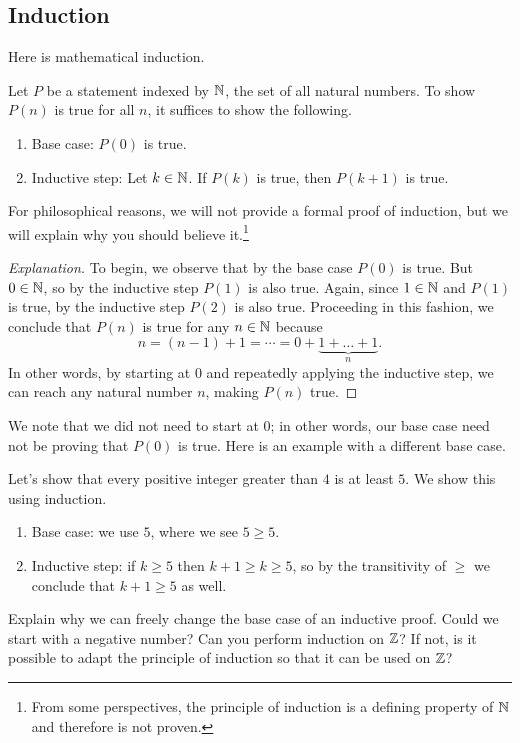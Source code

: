 \documentclass[../main.tex]{subfiles}
\begin{document}
\subsection{Induction}
Here is mathematical induction.
\begin{theorem}  \label{thm:induction}
    Let $P$ be a statement indexed by $\mathbb N$, the set of all natural numbers. To show $P(n)$ is true for all $n$, it suffices to show the following.
    \begin{enumerate}
        \item Base case: $P(0)$ is true.
        \item Inductive step: Let $k \in \mathbb N$. If $P(k)$ is true, then $P(k + 1)$ is true.
    \end{enumerate}
\end{theorem}
For philosophical reasons, we will not provide a formal proof of induction, but we will explain why you should believe it.\footnote{From some perspectives, the principle of induction is a defining property of $\mathbb N$ and therefore is not proven.}
\begin{proof}[Explanation]
    To begin, we observe that by the base case $P(0)$ is true. But $0 \in \mathbb N$, so by the inductive step $P(1)$ is also true. Again, since $1 \in \mathbb N$ and $P(1)$ is true, by the inductive step $P(2)$ is also true. Proceeding in this fashion, we conclude that $P(n)$ is true for any $n \in \mathbb N$ because
    \[n = (n - 1) + 1 = \cdots = 0 + \underbrace{1 + \dots + 1}_n.\]
    In other words, by starting at $0$ and repeatedly applying the inductive step, we can reach any natural number $n$, making $P(n)$ true.
\end{proof}
We note that we did not need to start at $0$; in other words, our base case need not be proving that $P(0)$ is true. Here is an example with a different base case.
\begin{example}
    Let's show that every positive integer greater than $4$ is at least $5$. We show this using induction.
    \begin{enumerate}
        \item Base case: we use $5$, where we see $5\ge 5$.
        \item Inductive step: if $k \geq 5$ then $k + 1 \geq k \geq 5$, so by the transitivity of $\geq$ we conclude that $k + 1 \geq 5$ as well.
    \end{enumerate}
\end{example}
\begin{exercise}
    Explain why we can freely change the base case of an inductive proof. Could we start with a negative number? Can you perform induction on $\mathbb Z$? If not, is it possible to adapt the principle of induction so that it can be used on $\mathbb Z$?
\end{exercise}
\end{document}
